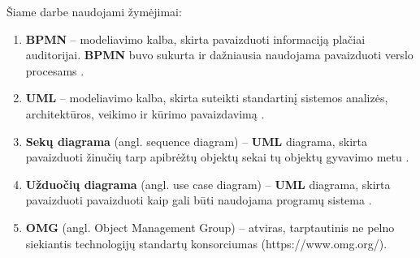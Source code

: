 \documentclass{VUMIFInfBakalaurinis}
\begin{document}
Šiame darbe naudojami žymėjimai:
\begin{enumerate}
	\item \textbf{BPMN} – modeliavimo kalba, skirta pavaizduoti informaciją plačiai auditorijai. \textbf{BPMN} buvo sukurta ir dažniausia naudojama pavaizduoti verslo procesams \cite{bpmnFormal}.
	\item \textbf{UML} – modeliavimo kalba, skirta suteikti standartinį sistemos analizės, architektūros, veikimo ir kūrimo pavaizdavimą \cite{omgUmlFormal}.
	\item \textbf{Sekų diagrama} (angl. sequence diagram) – \textbf{UML} diagrama, skirta pavaizduoti žinučių tarp apibrėžtų objektų sekai tų objektų gyvavimo metu \cite{omgUmlFormal}.
	\item \textbf{Užduočių diagrama} (angl. use case diagram) – \textbf{UML} diagrama, skirta pavaizduoti pavaizduoti kaip gali būti naudojama programų sistema \cite{algUseCasesFromBpmn}.
	\item \textbf{OMG} (angl. Object Management Group) – atviras, tarptautinis ne pelno siekiantis technologijų standartų konsorciumas (https://www.omg.org/).
\end{enumerate}

\appendix  %
\end{document}
